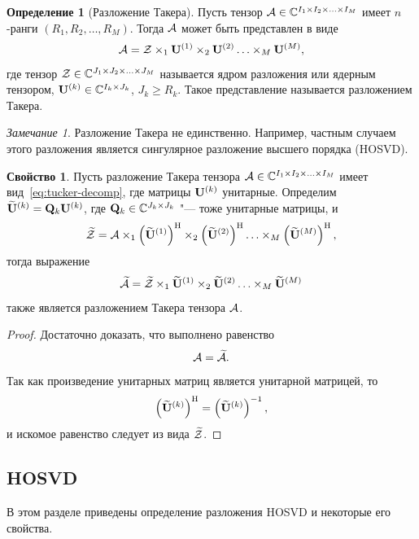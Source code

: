 \documentclass[specialist,
  substylefile = spbu.rtx,
subf,href,colorlinks=true, 12pt]{disser}
\theoremstyle{plain}
\theoremstyle{definition}
\newtheorem{definition}{Определение}[section]
\newtheorem{property}{Свойство}[section]
\theoremstyle{remark}
\newtheorem{remark}{Замечание}[section]
\begin{document}
\begin{definition}[Разложение Такера]
  Пусть тензор $\mathcal{A} \in \mathbb{C}^{I_1 \times I_2 \times \ldots \times
  I_M}$ имеет $n$-ранги
  $(R_1, R_2, \ldots, R_M)$.
  Тогда $\mathcal{A}$ может быть представлен в виде
  \begin{equation}
    \label{eq:tucker-decomp}
    \mathcal{A} = \mathcal{Z} \times_1 \mathbf{U}^{(1)} \times_2 \mathbf{U}^{(2)} \ldots
    \times_M \mathbf{U}^{(M)},
  \end{equation}
  где тензор $\mathcal{Z} \in \mathbb{C}^{J_1 \times J_2 \times \ldots \times
  J_M}$ называется ядром разложения или ядерным тензором,
  $\mathbf{U}^{(k)} \in \mathbb{C}^{I_k \times J_k}$, $J_k \geqslant R_k$.
  Такое представление называется разложением Такера.
\end{definition}

\begin{remark}
  Разложение Такера не единственно.
  Например, частным случаем этого разложения является сингулярное разложение
  высшего порядка (HOSVD).
\end{remark}

\begin{property}\label{property:tucker-basis-change}
  Пусть разложение Такера тензора $\mathcal{A} \in \mathbb{C}^{I_1 \times I_2
  \times \ldots \times I_M}$ имеет вид~\eqref{eq:tucker-decomp}, где матрицы
  $\mathbf{U}^{(k)}$ унитарные. Определим $\widetilde{\mathbf{U}}^{(k)} = \mathbf{Q}_k\mathbf{U}^{(k)}$,
  где $\mathbf{Q}_k\in \mathbb{C}^{J_k\times J_k}$ "--- тоже унитарные матрицы, и
  \[
    \widetilde{\mathcal{Z}} = \mathcal{A} \times_1
    \left(\widetilde{\mathbf{U}}^{(1)}\right)^{\mathrm{H}} \times_2
    \left(\widetilde{\mathbf{U}}^{(2)}\right)^{\mathrm{H}} \ldots
    \times_M \left(\widetilde{\mathbf{U}}^{(M)}\right)^{\mathrm{H}},
  \]
  тогда выражение
  \[
    \widetilde{\mathcal{A}} = \widetilde{\mathcal{Z}} \times_1 \widetilde{\mathbf{U}}^{(1)}
    \times_2 \widetilde{\mathbf{U}}^{(2)} \ldots
    \times_M \widetilde{\mathbf{U}}^{(M)}
  \]
  также является разложением Такера тензора $\mathcal{A}$.
\end{property}
\begin{proof}
  Достаточно доказать, что выполнено равенство
  \[
    \mathcal{A} = \widetilde{\mathcal{A}}.
  \]
  Так как произведение унитарных матриц является унитарной матрицей, то
  \[
    \left(\widetilde{\mathbf{U}}^{(k)}\right)^{\mathrm{H}} =
    \left(\widetilde{\mathbf{U}}^{(k)}\right)^{-1},
  \]
  и искомое равенство следует из вида $\widetilde{\mathcal{Z}}$.
\end{proof}

\subsection{HOSVD}\label{subsec:hosvd}
В этом разделе приведены определение разложения HOSVD и некоторые
его свойства.
\end{document}
